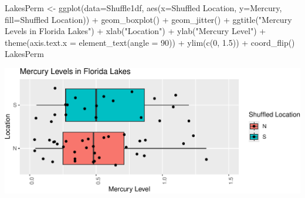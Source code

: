 \documentclass[
  letterpaper,
  DIV=11,
  numbers=noendperiod]{scrreprt}
\newenvironment{Shaded}{\begin{snugshade}}{\end{snugshade}}
\newcommand{\AttributeTok}[1]{\textcolor[rgb]{0.40,0.45,0.13}{#1}}
\newcommand{\DecValTok}[1]{\textcolor[rgb]{0.68,0.00,0.00}{#1}}
\newcommand{\FloatTok}[1]{\textcolor[rgb]{0.68,0.00,0.00}{#1}}
\newcommand{\FunctionTok}[1]{\textcolor[rgb]{0.28,0.35,0.67}{#1}}
\newcommand{\NormalTok}[1]{\textcolor[rgb]{0.00,0.23,0.31}{#1}}
\newcommand{\OtherTok}[1]{\textcolor[rgb]{0.00,0.23,0.31}{#1}}
\newcommand{\SpecialCharTok}[1]{\textcolor[rgb]{0.37,0.37,0.37}{#1}}
\newcommand{\StringTok}[1]{\textcolor[rgb]{0.13,0.47,0.30}{#1}}
\begin{document}
\begin{Shaded}
\end{Shaded}

\begin{Shaded}
\begin{Highlighting}[]
\NormalTok{LakesPerm }\OtherTok{\textless{}{-}} \FunctionTok{ggplot}\NormalTok{(}\AttributeTok{data=}\NormalTok{Shuffle1df, }\FunctionTok{aes}\NormalTok{(}\AttributeTok{x=}\StringTok{\textasciigrave{}}\AttributeTok{Shuffled Location}\StringTok{\textasciigrave{}}\NormalTok{, }\AttributeTok{y=}\NormalTok{Mercury, }\AttributeTok{fill=}\StringTok{\textasciigrave{}}\AttributeTok{Shuffled Location}\StringTok{\textasciigrave{}}\NormalTok{)) }\SpecialCharTok{+} 
  \FunctionTok{geom\_boxplot}\NormalTok{() }\SpecialCharTok{+}   \FunctionTok{geom\_jitter}\NormalTok{() }\SpecialCharTok{+} \FunctionTok{ggtitle}\NormalTok{(}\StringTok{"Mercury Levels in Florida Lakes"}\NormalTok{) }\SpecialCharTok{+} 
  \FunctionTok{xlab}\NormalTok{(}\StringTok{"Location"}\NormalTok{) }\SpecialCharTok{+} \FunctionTok{ylab}\NormalTok{(}\StringTok{"Mercury Level"}\NormalTok{) }\SpecialCharTok{+} \FunctionTok{theme}\NormalTok{(}\AttributeTok{axis.text.x =} \FunctionTok{element\_text}\NormalTok{(}\AttributeTok{angle =} \DecValTok{90}\NormalTok{)) }\SpecialCharTok{+} \FunctionTok{ylim}\NormalTok{(}\FunctionTok{c}\NormalTok{(}\DecValTok{0}\NormalTok{, }\FloatTok{1.5}\NormalTok{)) }\SpecialCharTok{+} \FunctionTok{coord\_flip}\NormalTok{()}
\NormalTok{LakesPerm}
\end{Highlighting}
\end{Shaded}

\includegraphics{Ch3_files/figure-pdf/unnamed-chunk-199-1.pdf}
\end{document}
